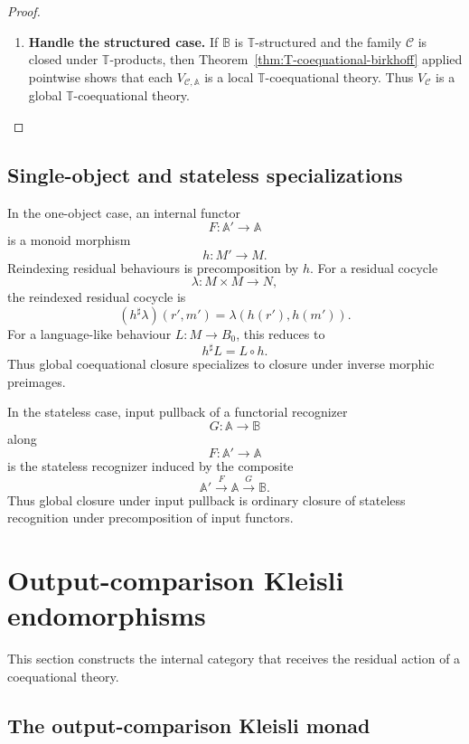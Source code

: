 \begin{proof}
\begin{enumerate}
        \item \textbf{Handle the structured case.}
        If \(\mathbb B\) is \(\mathbb T\)-structured and the family
        \(\mathcal C\) is closed under \(\mathbb T\)-products, then
        Theorem~\ref{thm:T-coequational-birkhoff} applied pointwise shows that
        each \(V_{\mathcal C,\mathbb A}\) is a local
        \(\mathbb T\)-coequational theory. Thus \(V_{\mathcal C}\) is a global
        \(\mathbb T\)-coequational theory.
    \end{enumerate}
\end{proof}

\subsection{Single-object and stateless specializations}
\label{subsec:global-single-object-stateless}

In the one-object case, an internal functor
\[
    F:\mathbb A'\to\mathbb A
\]
is a monoid morphism
\[
    h:M'\to M.
\]
Reindexing residual behaviours is precomposition by \(h\). For a residual
cocycle
\[
    \lambda:M\times M\to N,
\]
the reindexed residual cocycle is
\[
    (h^\sharp\lambda)(r',m')
    =
    \lambda(h(r'),h(m')).
\]
For a language-like behaviour \(L:M\to B_0\), this reduces to
\[
    h^\sharp L=L\circ h.
\]
Thus global coequational closure specializes to closure under inverse morphic
preimages.

In the stateless case, input pullback of a functorial recognizer
\[
    G:\mathbb A\to\mathbb B
\]
along
\[
    F:\mathbb A'\to\mathbb A
\]
is the stateless recognizer induced by the composite
\[
    \mathbb A'
    \xrightarrow{F}
    \mathbb A
    \xrightarrow{G}
    \mathbb B.
\]
Thus global closure under input pullback is ordinary closure of stateless
recognition under precomposition of input functors.

\section{Output-comparison Kleisli endomorphisms}
\label{sec:output-comparison-kleisli-endomorphisms}

This section constructs the internal category that receives the residual action
of a coequational theory.

\subsection{The output-comparison Kleisli monad}
\label{subsec:output-comparison-kleisli-monad}


